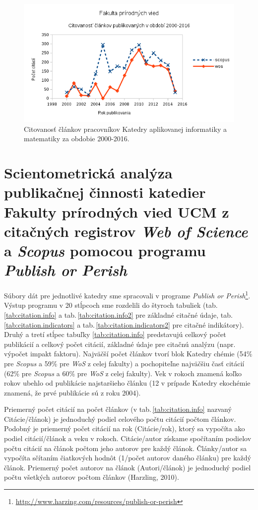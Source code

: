 \begin{figure}
  \centering
  \includegraphics[width=\textwidth]{obr/plot-inf-citations.png}
  \caption{Citovanosť článkov pracovníkov Katedry aplikovanej informatiky a
    matematiky za obdobie 2000-2016.}
  \label{fig:plot.inf.citations}
\end{figure}


\section{Scientometrická analýza publikačnej činnosti katedier Fakulty prírodných vied UCM z citačných registrov \emph{Web of Science} a \emph{Scopus} pomocou programu \emph{Publish or Perish}}

Súbory dát pre jednotlivé katedry sme spracovali v programe \emph{Publish or
Perish}\footnote{\url{http://www.harzing.com/resources/publish-or-perish}}. Výstup
programu v 20 stĺpcoch sme rozdelili do štyroch tabuliek
(tab.\,\ref{tab:citation.info} a tab.\,\ref{tab:citation.info2} pre základné
citačné údaje, tab.\,\ref{tab:citation.indicators} a
tab.\,\ref{tab:citation.indicators2} pre citačné indikátory).  Druhý a tretí
stĺpec tabuľky \ref{tab:citation.info} predstavujú celkový počet publikácií a
celkový počet citácií, základné údaje pre citačnú analýzu (napr. výpočet impakt
faktoru). Najväčší počet článkov tvorí blok Katedry chémie (54\% pre
\emph{Scopus} a 59\% pre \emph{WoS} z celej fakulty) a pochopiteľne najväčšiu
časť citácií (62\% pre \emph{Scopus} a 60\% pre \emph{WoS} z celej fakulty). Vek
v rokoch znamená koľko rokov ubehlo od publikácie najstaršieho článku (12 v
prípade Katedry ekochémie znamená, že prvé publikácie sú z roku 2004).

Priemerný počet citácií na počet článkov (v tab.\,\ref{tab:citation.info}
nazvaný Citácie/článok) je jednoduchý podiel celového počtu citácií počtom
článkov. Podobný je priemerný počet citácií na rok (Citácie/rok), ktorý sa
vypočíta ako podiel citácií/článok a veku v rokoch. Citácie/autor získame
spočítaním podielov počtu citácií na článok počtom jeho autorov pre každý
článok. Články/autor sa vypočíta sčítaním čiatkových hodnôt (1/počet autorov
daného článku) pre každý článok. Priemerný počet autorov na článok
(Autori/článok) je jednoduchý podiel počtu všetkých autorov počtom článkov
(Harzling, 2010).


